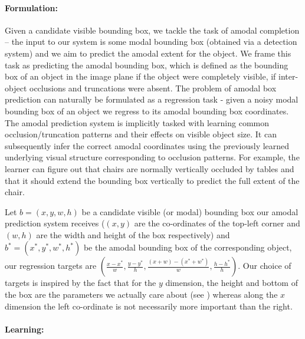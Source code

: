 \paragraph{Formulation:} Given a candidate visible bounding box, we tackle the task of amodal completion -- the input to our system is some modal bounding box (\eg obtained via a detection system) and we aim to predict the amodal extent for the object. We frame this task as predicting the amodal bounding box, which is defined as  the bounding box of an object in the image plane if the object were completely visible, \ie if inter-object occlusions and truncations were absent. The problem of amodal box prediction can naturally be formulated as a regression task - given a noisy modal bounding box of an object we regress to its amodal bounding box coordinates. The amodal prediction system is implicitly tasked with learning common occlusion/truncation patterns and their effects on visible object size. It can subsequently infer the correct amodal coordinates using the previously learned underlying visual structure corresponding to occlusion patterns. For example, the learner can figure out that chairs are normally vertically occluded by tables and that it should extend the bounding box vertically to predict the full extent of the chair.

Let $b = (x,y,w,h)$ be a candidate visible (or modal) bounding box our amodal prediction system receives ($(x,y)$ are the co-ordinates of the top-left corner and $(w,h)$ are the width and height of the box respectively) and $b^* = (x^*,y^*,w^*,h^*)$ be the amodal bounding box of the corresponding object, our regression targets are $(\frac{x-x^*}{w},\frac{y-y^*}{h},\frac{(x+w)-(x^*+w^*)}{w},\frac{h-h^*}{h})$. Our choice of targets is inspired by the fact that for the $y$ dimension, the height and bottom of the box are the parameters we actually care about (see ) whereas along the $x$ dimension the left co-ordinate is not necessarily more important than the right.

\paragraph{Learning:}

